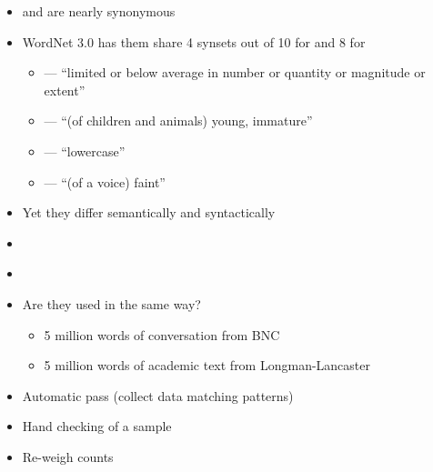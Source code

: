 \documentclass[a4paper,landscape,headrule,footrule,xetex]{foils}
\begin{document}
\begin{itemize}
\item {} and  are nearly synonymous
\item WordNet 3.0 has them share 4 synsets out of 10 for  and 8 for 
  \begin{itemize}
  \item {} --- ``limited or below average in number or quantity or magnitude or extent'' 
  \item {} --- ``(of children and animals) young, immature'' 
  \item {} --- ``lowercase'' 
  \item {} --- ``(of a voice) faint'' 
\end{itemize}
\item Yet they differ semantically and syntactically
\end{itemize}

\MyLogo{}
\begin{itemize}
\item {}
  \\ 
\item {}
  \\ 
\item Are they used in the same way?
  \begin{itemize}
  \item 5 million words of conversation from BNC
  \item 5 million words of academic text from Longman-Lancaster
  \end{itemize}
\end{itemize}


\begin{itemize}
\item Automatic pass (collect data matching patterns)
\item Hand checking of a sample
\item Re-weigh counts
\end{itemize}
\end{document}
